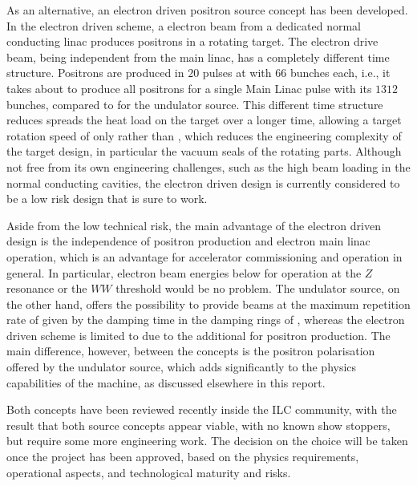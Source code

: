 As an alternative, an electron driven positron source concept has been developed.
In the electron driven scheme, a  electron beam from a dedicated normal conducting linac produces positrons in a rotating target.
The electron drive beam, being independent from the main linac, has a completely different time structure. 
Positrons are produced in $20$ pulses at  with $66$ bunches each, i.e., it takes about  to produce all positrons for a single Main Linac pulse with its $1312$ bunches, compared to  for the undulator source.
This different time structure reduces spreads the heat load on the target over a longer time, allowing a target rotation speed of only  rather than , which reduces the engineering complexity of the target design, in particular the vacuum seals of the rotating parts.
Although not free from its own engineering challenges, such as the high beam loading in the normal conducting cavities, the electron driven design is currently considered to be a low risk design that is sure to work.

Aside from the low technical risk, the main advantage of the electron driven design is the independence of positron production and electron main linac operation, which is an advantage for accelerator commissioning and operation in general.
In particular, electron beam energies below  for operation at the $Z$ resonance or the $WW$ threshold would be no problem.
The undulator source, on the other hand, offers the possibility to provide beams at the maximum repetition rate of  given by the damping time in the damping rings of , whereas the electron driven scheme is limited to  due to the additional  for positron production.
The main difference, however, between the concepts is the positron polarisation offered by the undulator source, which adds significantly to the physics capabilities of the machine, as discussed elsewhere in this report. 

Both concepts have been reviewed recently \cite{PWG:2018a} inside the ILC community, with the result that both source concepts appear viable, with no known show stoppers, but require some more engineering work. 
The decision on the choice will be taken once the project has been approved, based on the physics requirements, operational aspects, and technological maturity and risks. 


